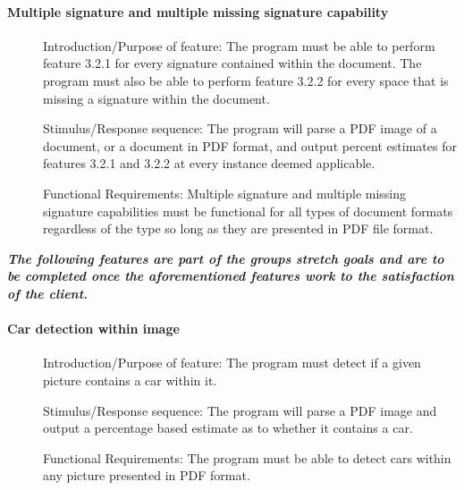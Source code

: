 \documentclass[article, onecolumn, draftclsnofoot,10pt, compsoc]{IEEEtran}
\begin{document}
\paragraph{Multiple signature and multiple missing signature capability}\vspace{.5cm}
\begin{description}
\item [] Introduction/Purpose of feature: The program must be able to perform feature 3.2.1 for every signature contained within the document. The program must also be able to perform feature 3.2.2 for every space that is missing a signature within the document.
\item [] Stimulus/Response sequence: The program will parse a PDF image of a document, or a document in PDF format, and output percent estimates for features 3.2.1 and 3.2.2 at every instance deemed applicable. 
\item [] Functional Requirements: Multiple signature and multiple missing signature capabilities must be functional for all types of document formats regardless of the type so long as they are presented in PDF file format.
\end{description}

\vspace{.75cm}
\textbf{\textit{The following features are part of the groups stretch goals and are to be completed once the aforementioned features work to the satisfaction of the client. 
}}
\vspace{.75cm}


\paragraph{Car detection within image}\vspace{.5cm}
\begin{description}
\item [] Introduction/Purpose of feature: The program must detect if a given picture contains a car within it.
\item [] Stimulus/Response sequence: The program will parse a PDF image and output a percentage based estimate as to whether it contains a car.
\item [] Functional Requirements: The program must be able to detect cars within any picture presented in PDF format.
\end{description}
\end{document}
